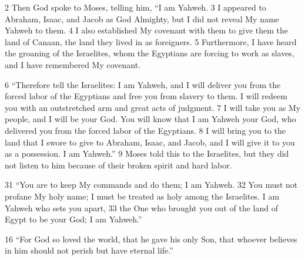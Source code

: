 \begin{bible}
2 Then God spoke to Moses, telling him, ``I am Yahweh.  3 I appeared to Abraham, Isaac, and Jacob as God Almighty, but I did not reveal My name Yahweh to them.  4 I also established My covenant with them to give them the land of Canaan, the land they lived in as foreigners.  5 Furthermore, I have heard the groaning of the Israelites, whom the Egyptians are forcing to work as slaves, and I have remembered My covenant.

6 ``Therefore tell the Israelites: I am Yahweh, and I will deliver you from the forced labor of the Egyptians and free you from slavery to them. I will redeem you with an outstretched arm and great acts of judgment.  7 I will take you as My people, and I will be your God. You will know that I am Yahweh your God, who delivered you from the forced labor of the Egyptians.  8 I will bring you to the land that I swore to give to Abraham, Isaac, and Jacob, and I will give it to you as a possession. I am Yahweh.''  9 Moses told this to the Israelites, but they did not listen to him because of their broken spirit and hard labor.


31 ``You are to keep My commands and do them; I am Yahweh.  32 You must not profane My holy name; I must be treated as holy among the Israelites. I am Yahweh who sets you apart,  33 the One who brought you out of the land of Egypt to be your God; I am Yahweh.''


16 ``For God so loved the world, that he gave his only Son, that whoever believes in him should not perish but have eternal life.''

\end{bible}


